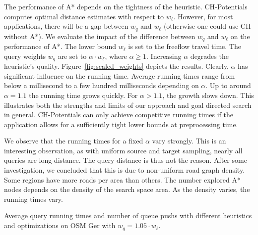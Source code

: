 \documentclass[a4paper,UKenglish,cleveref, autoref, thm-restate]{lipics-v2021}
\begin{document}
The performance of A* depends on the tightness of the heuristic.
CH-Potentials computes optimal distance estimates with respect to $w_\ell$.
However, for most applications, there will be a gap between $w_q$ and $w_\ell$ (otherwise one could use CH without A*).
We evaluate the impact of the difference between $w_q$ and $w_\ell$ on the performance of A*.
The lower bound $w_\ell$ is set to the freeflow travel time.
The query weights $w_q$ are set to $\alpha \cdot w_\ell$, where $\alpha\ge 1$.
Increasing $\alpha$ degrades the heuristic's quality.
Figure~\ref{fig:scaled_weights} depicts the results.
Clearly, $\alpha$ has significant influence on the running time.
Average running times range from below a millisecond to a few hundred milliseconds depending on $\alpha$.
Up to around $\alpha = 1.1$ the running time grows quickly.
For $\alpha > 1.1$, the growth slows down.
This illustrates both the strengths and limits of our approach and goal directed search in general.
CH-Potentials can only achieve competitive running times if the application allows for a sufficiently tight lower bounds at preprocessing time.

We observe that the running times for a fixed $\alpha$ vary strongly.
This is an interesting observation, as with uniform source and target sampling, nearly all queries are long-distance.
The query distance is thus not the reason.
After some investigation, we concluded that this is due to non-uniform road graph density.
Some regions have more roads per area than others.
The number explored A* nodes depends on the density of the search space area.
As the density varies, the running times vary.

\begin{table}
\centering
\caption{Average query running times and number of queue pushs with different heuristics and optimizations on OSM Ger with $w_q = 1.05 \cdot w_\ell$.}\label{tab:building_blocks}

\end{table}
\end{document}
